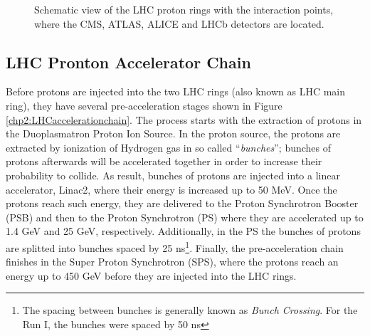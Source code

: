 \begin{figure}[ht]
\begin{center}
\caption{Schematic view of the LHC proton rings with the interaction points, 
where the CMS, ATLAS, ALICE and LHCb detectors are located.}\label{chp2:LHCringsfigure}
\end{center}
\end{figure}

\subsection{LHC Pronton Accelerator Chain}
\label{subsec:ProtonAcceleratorChain}


Before protons are injected into the two LHC rings (also known as LHC main ring), they have several
pre-acceleration stages  shown in Figure \ref{chp2:LHCaccelerationchain}. The process starts with the extraction of protons 
in the Duoplasmatron Proton Ion Source. In the proton source, the protons are 
extracted by ionization of Hydrogen gas in so called ``\textit{bunches}''; bunches of protons 
afterwards will be accelerated together in order to increase their probability to collide. As 
result, bunches of protons are injected into a linear accelerator, Linac2, where their energy is increased up to 50 MeV. Once the protons 
reach such energy, they are delivered to the Proton Synchrotron Booster (PSB) and then to the
Proton Synchrotron (PS) where they are accelerated up to 1.4 GeV and 25 GeV, respectively. Additionally,
in the PS the bunches of protons are splitted into bunches spaced by 
25 ns\footnote{The spacing between bunches is generally known as \textit{Bunch Crossing}. For the Run I, the bunches were spaced by 50 ns}. Finally, 
the pre-acceleration chain finishes in the Super Proton Synchrotron (SPS), where 
the protons reach an energy up to 450 GeV before they are injected into the LHC rings. 

